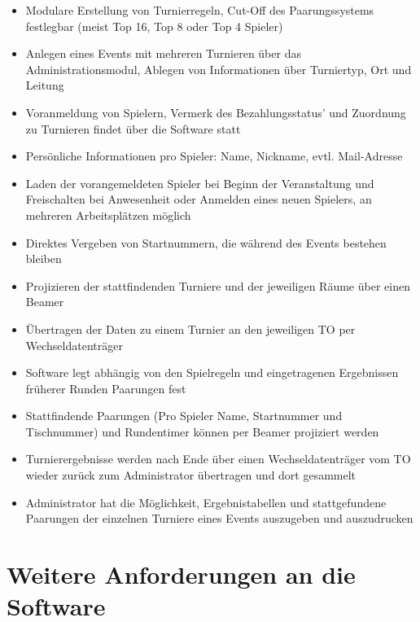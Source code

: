 \documentclass[11pt]{article}
\begin{document}
\begin{itemize}
	\item Modulare Erstellung von Turnierregeln, Cut-Off des Paarungssystems festlegbar (meist Top 16, Top 8 oder Top 4 Spieler)
	\item Anlegen eines Events mit mehreren Turnieren über das Administrationsmodul, Ablegen von Informationen über Turniertyp, Ort und Leitung
	\item Voranmeldung von Spielern, Vermerk des Bezahlungsstatus' und Zuordnung zu Turnieren findet über die Software statt
	\item Persönliche Informationen pro Spieler: Name, Nickname, evtl. Mail-Adresse
	\item Laden der vorangemeldeten Spieler bei Beginn der Veranstaltung und Freischalten bei Anwesenheit oder Anmelden eines neuen Spielers, an mehreren Arbeitsplätzen möglich
	\item Direktes Vergeben von Startnummern, die während des Events bestehen bleiben
	\item Projizieren der stattfindenden Turniere und der jeweiligen Räume über einen Beamer
	\item Übertragen der Daten zu einem Turnier an den jeweiligen TO per Wechseldatenträger
	\item Software legt abhängig von den Spielregeln und eingetragenen Ergebnissen früherer Runden Paarungen fest
	\item Stattfindende Paarungen (Pro Spieler Name, Startnummer und Tischnummer) und Rundentimer können per Beamer projiziert werden
	\item Turnierergebnisse werden nach Ende über einen Wechseldatenträger vom TO wieder zurück zum Administrator übertragen und dort gesammelt
	\item Administrator hat die Möglichkeit, Ergebnistabellen und stattgefundene Paarungen der einzelnen Turniere eines Events auszugeben und auszudrucken
\end{itemize}

\newpage
\section{Weitere Anforderungen an die Software}
\end{document}
